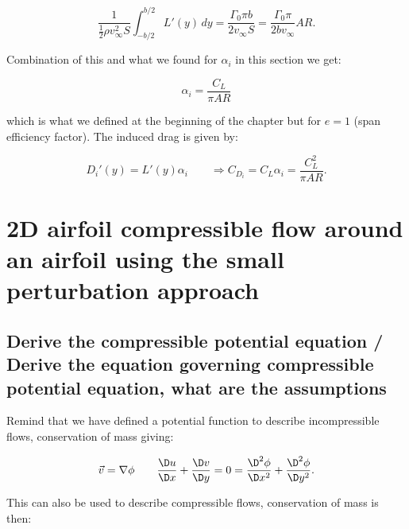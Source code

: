 \documentclass[british,french,11pt, a4paper, openany]{article}
\begin{document}
\begin{equation}
\frac{1}{\frac{1}{2}\rho v_\infty ^2 S} \int _{-b/2}^{b/2} L'(y) \, dy = \frac{\Gamma _0\pi b}{2v_\infty S} = \frac{\Gamma _0 \pi}{2bv_\infty} AR.
\end{equation}

Combination of this and what we found for $\alpha _i$ in this section we get:

\begin{equation}
\alpha _i = \frac{C_L}{\pi AR}
\end{equation}

which is what we defined at the beginning of the chapter but for $e =1$ (span efficiency factor). The induced drag is given by:

\begin{equation}
D_i'(y) = L'(y) \alpha _i \qquad \Rightarrow C_{D_i} = C_L \alpha _i = \frac{C_L^2}{\pi AR}.
\end{equation}



\section{2D airfoil compressible flow around an airfoil using the small perturbation approach}

\subsection{Derive the compressible potential equation / Derive the equation governing compressible potential equation, what are the assumptions}

Remind that we have defined a potential function to describe incompressible flows, conservation of mass giving:

\begin{equation}
\vec{v} = \nabla \phi \qquad \frac{\D u}{\D x} + \frac{\D v}{\D y} = 0 = \frac{\D^2 \phi}{\D x^2} + \frac{\D^2 \phi}{\D y^2}.
\end{equation}

This can also be used to describe compressible flows, conservation of mass is then: 
\end{document}
